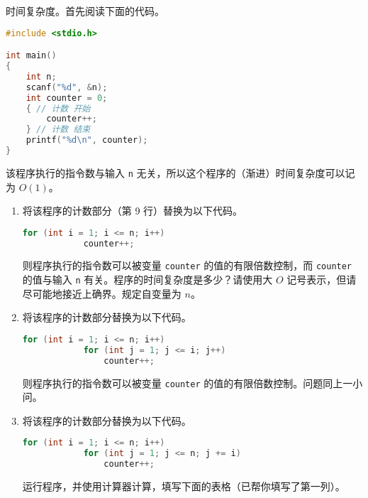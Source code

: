 \begin{problemset}
	\item 时间复杂度。首先阅读下面的代码。

	\begin{lstlisting}[language=c]
#include <stdio.h>

int main()
{
	int n;
	scanf("%d", &n);
	int counter = 0;
	{ // 计数 开始
		counter++;
	} // 计数 结束
	printf("%d\n", counter);
}
	\end{lstlisting}

	该程序执行的指令数与输入 \lstinline{n} 无关，所以这个程序的（渐进）时间复杂度可以记为 $O(1)$。

	\begin{enumerate}
		\item 将该程序的计数部分（第 9 行）替换为以下代码。

		\begin{lstlisting}[language=c, firstnumber=9]
		for (int i = 1; i <= n; i++)
			counter++;
		\end{lstlisting}

		则程序执行的指令数可以被变量 \lstinline{counter} 的值的有限倍数控制，而 \lstinline{counter} 的值与输入 \lstinline{n} 有关。程序的时间复杂度是多少？请使用大 $O$ 记号表示，但请尽可能地接近上确界。规定自变量为 $n$。

		\item 将该程序的计数部分替换为以下代码。

		\begin{lstlisting}[language=c, firstnumber=9]
		for (int i = 1; i <= n; i++)
			for (int j = 1; j <= i; j++)
				counter++;
		\end{lstlisting}

		则程序执行的指令数可以被变量 \lstinline{counter} 的值的有限倍数控制。问题同上一小问。

		\item 将该程序的计数部分替换为以下代码。

		\begin{lstlisting}[language=c, firstnumber=9]
		for (int i = 1; i <= n; i++)
			for (int j = 1; j <= n; j += i)
				counter++;
		\end{lstlisting}

		运行程序，并使用计算器计算，填写下面的表格（已帮你填写了第一列）。


\end{enumerate}
\end{problemset}
